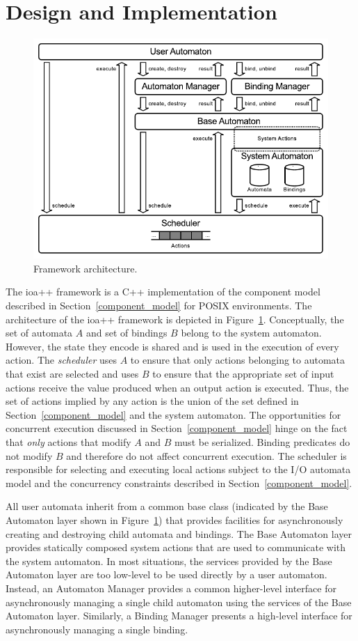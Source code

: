 \section{Design and Implementation\label{design}}

\begin{figure}
\center
\includegraphics[width=.6\columnwidth]{architecture}
\caption{Framework architecture.}
\label{framework_architecture}
\end{figure}

The ioa++ framework is a C++ implementation of the component model described in Section~\ref{component_model} for POSIX environments.
The architecture of the ioa++ framework is depicted in Figure~\ref{framework_architecture}.
Conceptually, the set of automata $A$ and set of bindings $B$ belong to the system automaton.
However, the state they encode is shared and is used in the execution of every action.
The \emph{scheduler} uses $A$ to ensure that only actions belonging to automata that exist are selected and uses $B$ to ensure that the appropriate set of input actions receive the value produced when an output action is executed.
Thus, the set of actions implied by any action is the union of the set defined in Section~\ref{component_model} and the system automaton.
The opportunities for concurrent execution discussed in Section~\ref{component_model} hinge on the fact that \emph{only} actions that modify $A$ and $B$ must be serialized.
Binding predicates do not modify $B$ and therefore do not affect concurrent execution.
The scheduler is responsible for selecting and executing local actions subject to the I/O automata model and the concurrency constraints described in Section~\ref{component_model}.

All user automata inherit from a common base class (indicated by the Base Automaton layer shown in Figure~\ref{framework_architecture}) that provides facilities for asynchronously creating and destroying child automata and bindings.
The Base Automaton layer provides statically composed system actions that are used to communicate with the system automaton.
In most situations, the services provided by the Base Automaton layer are too low-level to be used directly by a user automaton.
Instead, an Automaton Manager provides a common higher-level interface for asynchronously managing a single child automaton using the services of the Base Automaton layer.
Similarly, a Binding Manager presents a high-level interface for asynchronously managing a single binding.

